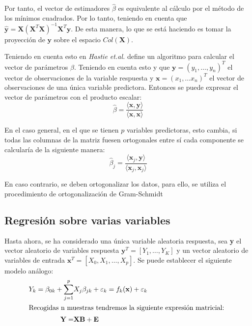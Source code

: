 \noindent Por tanto, el vector de estimadores $\hat{\beta}$ es equivalente al cálculo por el método de los mínimos cuadrados. 
Por lo tanto, teniendo en cuenta que $\hat{\textbf{y}}=\textbf{X}(\textbf{X}^T\textbf{X})^{-1} \textbf{X}^T \textbf{y}$. De esta manera, lo que se está haciendo es tomar la proyección de $\textbf{y}$ sobre el espacio $Col(\textbf{X})$. 

\noindent Teniendo en cuenta esto en \textit{Hastie et.al.} \cite{Hastie 2001} define un algoritmo para calcular el vector de parámetros $\beta$. Teniendo en cuenta esto y que $\textbf{y}=(y_1,\ldots,y_n)^T$ el vector  de observaciones de la variable respuesta y $\textbf{x}=(x_1,\ldots x_n)^T$ el vector de observaciones de una única variable predictora. Entonces se puede expresar el vector de parámetros con el producto escalar: 
\begin{equation}
\hat{\beta}=\dfrac{\langle \textbf{x},\textbf{y} \rangle}{\langle \textbf{x},\textbf{x} \rangle}
\end{equation}

\noindent En el caso general, en el que se tienen $p$ variables predictoras, esto cambia, si todas las columnas de la matriz fuesen ortogonales entre sí cada componente se calcularía de la siguiente manera:
\begin{equation}
\hat{\beta}_j=\dfrac{\langle \textbf{x}_j,\textbf{y}\rangle}{\langle \textbf{x}_j,\textbf{x}_j\rangle}
\end{equation}

\noindent En caso contrario, se deben ortogonalizar los datos, para ello, se utiliza el procedimiento de ortogonalización de Gram-Schmidt







\subsection{Regresión sobre varias variables}
\noindent Hasta ahora, se ha considerado una única variable aleatoria respuesta, sea \textbf{y} el vector aleatorio de variables respuesta $\textbf{y}^T=[Y_1,\ldots, Y_K]$ y un vector aleatorio de variables de entrada $\textbf{x}^T=[X_0, X_1,\ldots, X_p]$. Se puede establecer el siguiente modelo análogo:
\begin{align}
Y_k=\beta_{0k}+\sum_{j=1}^p& X_j\beta_{jk}+\varepsilon_k=f_k(\textbf{x})+\varepsilon_k\\
\intertext{Recogidas n muestras tendremos la siguiente expresión matricial: }
\textbf{Y}=&\textbf{X}\textbf{B}+\textbf{E}
\end{align}


